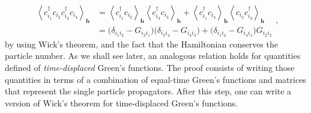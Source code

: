 \begin{equation}
\begin{split}
\left\langle c_{i_1}^\dagger c_{i_2} c_{i_3}^\dagger c_{i_4} \right\rangle_{\bm h} &= \left\langle c_{i_1}^\dagger c_{i_2} \right\rangle_{\bm h} \left\langle c_{i_3}^\dagger c_{i_4} \right\rangle_{\bm h} + \left\langle c_{i_1}^\dagger c_{i_4} \right\rangle_{\bm h} \left\langle  c_{i_2} c_{i_3}^\dagger  \right\rangle_{\bm h} \\
&= \bigg( \delta_{i_1 i_2} - G_{i_2 i_1}  \bigg) \bigg( \delta_{i_3 i_4} - G_{i_4 i_3}  \bigg) + \bigg( \delta_{i_1 i_4} - G_{i_4 i_1}  \bigg) G_{i_2 i_3}
\end{split} ,
\end{equation}
by using Wick's theorem, and the fact that the Hamiltonian conserves the particle number.
As we shall see later, an analogous relation holds for quantities defined of \emph{time-displaced} Green's functions.
The proof consists of writing those quantities in terms of a combination of equal-time Green's functions and matrices that represent the single particle propagators.
After this step, one can write a version of Wick's theorem for time-displaced Green's functions.
